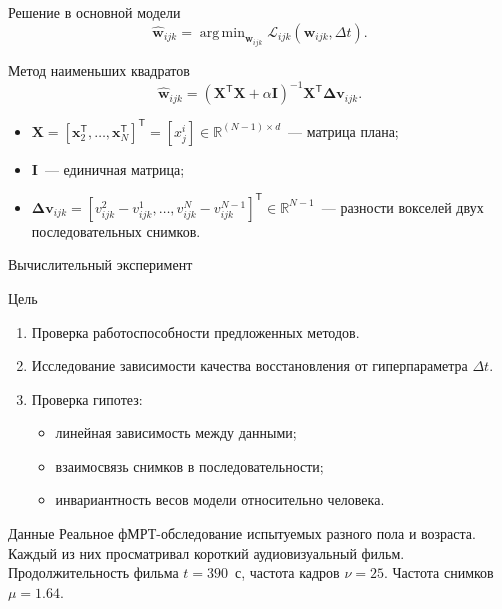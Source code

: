 \documentclass{beamer}
\newcommand{\T}{^{\mathsf{T}}}
\DeclareMathOperator*{\argmin}{arg\,min}  %
\begin{document}
\begin{frame}{Решение в основной модели}
    \begin{equation*}
		\label{eq17}
		\hat{\mathbf{w}}_{ijk} = \argmin_{\mathbf{w}_{ijk}} \mathcal{L}_{ijk}(\mathbf{w}_{ijk}, \Delta t).
	\end{equation*}

    \begin{block}{Метод наименьших квадратов}
        \begin{equation*}
            \label{eq20}
            \hat{\mathbf{w}}_{ijk} = (\mathbf{X}\T \mathbf{X} + \alpha \mathbf{I})^{-1} \mathbf{X}\T \mathbf{\Delta v}_{ijk}.
        \end{equation*}
        \begin{itemize}
            \item $\mathbf{X} = [\mathbf{x}_2\T, \ldots, \mathbf{x}_N\T]\T = [x^i_j] \in \mathbb{R}^{(N-1) \times d}$~--- матрица плана;
            \item $\mathbf{I}$~--- единичная матрица;
            \item $\mathbf{\Delta v}_{ijk} = [v^2_{ijk} - v^1_{ijk}, \ldots, v^N_{ijk} - v^{N-1}_{ijk}]\T \in \mathbb{R}^{N-1}$~--- разности вокселей двух последовательных снимков.
        \end{itemize}
    \end{block}
\end{frame}
\begin{frame}{Вычислительный эксперимент}
    \begin{block}{Цель}
        \begin{enumerate}
            \item Проверка работоспособности предложенных методов.
            \item Исследование зависимости качества восстановления от гиперпараметра $\Delta t$.
            \item Проверка гипотез:
                    \begin{itemize}
                        \item линейная зависимость между данными;
                        \item взаимосвязь снимков в последовательности;
                        \item инвариантность весов модели относительно человека.
                    \end{itemize}
        \end{enumerate}
    \end{block}
    \begin{block}{Данные}
        Реальное фМРТ-обследование испытуемых разного пола и возраста.
        Каждый из них просматривал короткий аудиовизуальный фильм.
        Продолжительность фильма $t = 390$~с, частота кадров $\nu = 25$.
        Частота снимков $\mu = 1.64$.
    \end{block}
\end{frame}
\end{document}
